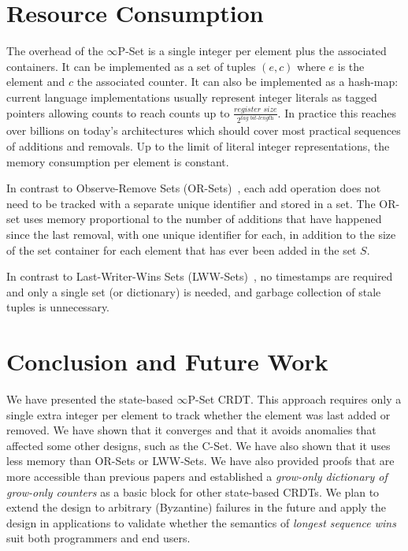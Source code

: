 \documentclass[9pt, oneside]{article}   	%
\begin{document}
\section{Resource Consumption}
\label{sec:resource-consumption}

The overhead of the $\infty$P-Set is a single integer per element plus the associated containers. It can be implemented as a set of tuples $(e,c)$ where $e$ is the element and $c$ the associated counter. It can also be implemented as a hash-map: current language implementations usually represent integer literals as tagged pointers allowing counts to reach counts up to 
$\frac{\textit{register size}}{2^\textit{tag bit-length}}$. In practice this reaches over billions on today's architectures which should cover most practical sequences of additions and removals. Up to the limit of literal integer representations, the memory consumption per element is constant.

In contrast to Observe-Remove Sets (OR-Sets)~\cite{shapiro:inria-00555588}, each add operation does not need to be tracked with a separate unique identifier and stored in a set. The OR-set uses memory proportional to the number of additions that have happened since the last removal, with one unique identifier for each, in addition to the size of the set container for each element that has ever been added in the set $S$.

In contrast to Last-Writer-Wins Sets (LWW-Sets)~\cite{shapiro:inria-00555588}, no timestamps are required and only a single set (or dictionary) is needed, and garbage collection of stale tuples is unnecessary.

\section{Conclusion and Future Work}
\label{sec:conclusion}

We have presented the state-based $\infty$P-Set CRDT. This approach requires only a single extra integer per element to track whether the element was last added or removed. We have shown that it converges and that it avoids anomalies that affected some other designs, such as the C-Set. We have also shown that it uses less memory than OR-Sets or LWW-Sets. We have also provided proofs that are more accessible than previous papers and established a \textit{grow-only dictionary of grow-only counters} as a basic block for other state-based CRDTs. We plan to extend the design to arbitrary (Byzantine) failures in the future and apply the design in applications to validate whether the semantics of \textit{longest sequence wins} suit both programmers and end users.
\end{document}
